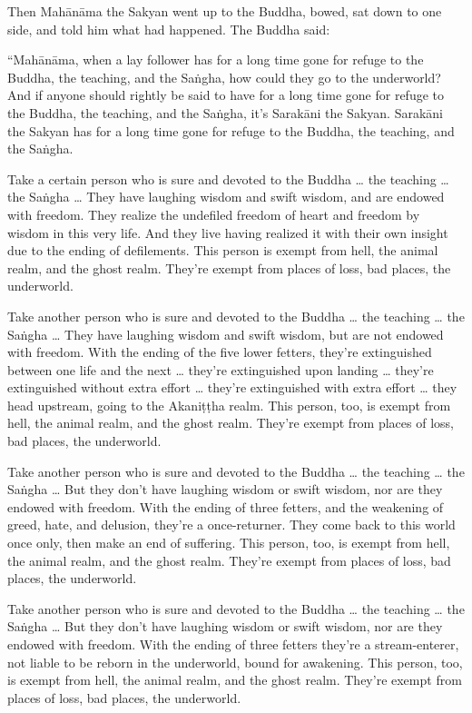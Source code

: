 \documentclass[12pt,openany]{book}%
\begin{document}
Then \textsanskrit{Mahānāma} the Sakyan went up to the Buddha, bowed, sat down to one side, and told him what had happened. The Buddha said: 

“\textsanskrit{Mahānāma}, when a lay follower has for a long time gone for refuge to the Buddha, the teaching, and the \textsanskrit{Saṅgha}, how could they go to the underworld? And if anyone should rightly be said to have for a long time gone for refuge to the Buddha, the teaching, and the \textsanskrit{Saṅgha}, it’s \textsanskrit{Sarakāni} the Sakyan. \textsanskrit{Sarakāni} the Sakyan has for a long time gone for refuge to the Buddha, the teaching, and the \textsanskrit{Saṅgha}. 

Take a certain person who is sure and devoted to the Buddha … the teaching … the \textsanskrit{Saṅgha} … They have laughing wisdom and swift wisdom, and are endowed with freedom. They realize the undefiled freedom of heart and freedom by wisdom in this very life. And they live having realized it with their own insight due to the ending of defilements. This person is exempt from hell, the animal realm, and the ghost realm. They’re exempt from places of loss, bad places, the underworld. 

Take another person who is sure and devoted to the Buddha … the teaching … the \textsanskrit{Saṅgha} … They have laughing wisdom and swift wisdom, but are not endowed with freedom. With the ending of the five lower fetters, they’re extinguished between one life and the next … they’re extinguished upon landing … they’re extinguished without extra effort … they’re extinguished with extra effort … they head upstream, going to the \textsanskrit{Akaniṭṭha} realm. This person, too, is exempt from hell, the animal realm, and the ghost realm. They’re exempt from places of loss, bad places, the underworld. 

Take another person who is sure and devoted to the Buddha … the teaching … the \textsanskrit{Saṅgha} … But they don’t have laughing wisdom or swift wisdom, nor are they endowed with freedom. With the ending of three fetters, and the weakening of greed, hate, and delusion, they’re a once-returner. They come back to this world once only, then make an end of suffering. This person, too, is exempt from hell, the animal realm, and the ghost realm. They’re exempt from places of loss, bad places, the underworld. 

Take another person who is sure and devoted to the Buddha … the teaching … the \textsanskrit{Saṅgha} … But they don’t have laughing wisdom or swift wisdom, nor are they endowed with freedom. With the ending of three fetters they’re a stream-enterer, not liable to be reborn in the underworld, bound for awakening. This person, too, is exempt from hell, the animal realm, and the ghost realm. They’re exempt from places of loss, bad places, the underworld. 
\end{document}
